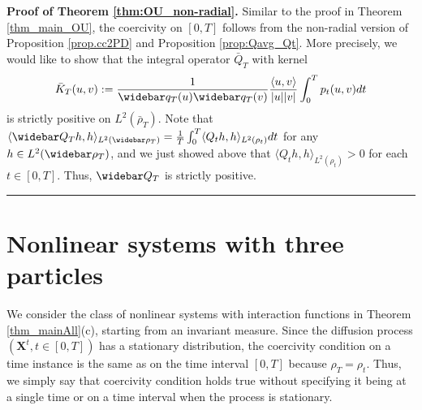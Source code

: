 \documentclass[]{elsarticle}
\newcommand{\wbar}\widebar
\newcommand{\mbf}[1]{\boldsymbol{#1}}
\newcommand{\innerp}[2]{\langle #1,#2 \rangle}
\newcommand{\bX}{\mbf{X}}
\newcommand{\FL}[1]{\textcolor{blue}{{#1}}}
\newenvironment{proof}[1][Proof]{\noindent\textbf{#1.} }{\ \rule{0.5em}{0.5em}}
\numberwithin{equation}{section}
\numberwithin{theorem}{section}
\begin{document}
\begin{proof}[Proof of Theorem \ref{thm:OU_non-radial}]
Similar to the proof in Theorem \ref{thm_main_OU}, the coercivity on $[0,T]$ follows from the non-radial version of Proposition \ref{prop.cc2PD} and Proposition \ref{prop:Qavg_Qt}. More precisely, we would like to show that the integral operator $\bar Q_T$ with kernel 
 \begin{equation*}
\bar K_T(u,v) := \frac{1}{\wbar q_T(u)\wbar q_T(v)} \frac{\innerp{u}{v}}{|u||v|} \int_0^Tp_t(u,v)dt
 \end{equation*} is strictly positive on $L^2(\bar\rho_T)$. Note that  $\langle \wbar Q_T  h, h\rangle_{L^2(\wbar\rho_T)}  = \frac{1}{T} \int_0^T \langle Q_t h, h\rangle_{L^2(\rho_t)} dt$ for any $h\in L^2(\wbar \rho_T)$, and we just showed above that $\langle Q_t h, h\rangle_{L^2(\rho_t)}>0$ for each $t\in [0,T]$. Thus, $\wbar Q_T$ is strictly positive. 
 \end{proof}

\section{Nonlinear systems with three particles}\label{sec:3particleSys}
We consider the class of nonlinear systems with interaction functions in Theorem \ref{thm_mainAll}(c), starting from an invariant measure. Since the diffusion process $(\bX^t, t\in [0,T])$ has a stationary distribution, the coercivity condition on a time instance is the same as on the time interval  $[0,T]$ because $\rho_T=\rho_t$. Thus, we simply say that coercivity condition holds true without specifying it being at a single time or on a time interval when the process is stationary.  
\end{document}
